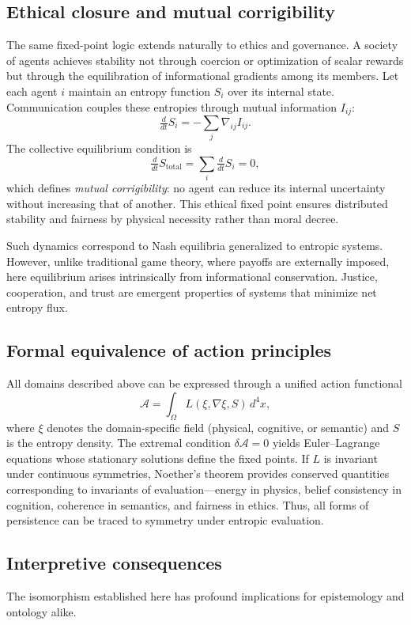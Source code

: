 \documentclass[12pt,a4paper]{article}
\newcommand{\ddt}{\tfrac{d}{dt}}      %
\theoremstyle{plain}
\begin{document}
\subsection{Ethical closure and mutual corrigibility}
The same fixed-point logic extends naturally to ethics and governance.
A society of agents achieves stability not through coercion or optimization of scalar rewards
but through the equilibration of informational gradients among its members.
Let each agent \(i\) maintain an entropy function \(S_i\) over its internal state.
Communication couples these entropies through mutual information \(I_{ij}\):
\[
\ddt S_i = -\sum_j \nabla_{ij} I_{ij}.
\]
The collective equilibrium condition is
\[
\ddt S_\text{total} = \sum_i \ddt S_i = 0,
\]
which defines \emph{mutual corrigibility}:
no agent can reduce its internal uncertainty without increasing that of another.
This ethical fixed point ensures distributed stability and fairness by physical necessity rather than moral decree.

Such dynamics correspond to Nash equilibria generalized to entropic systems.
However, unlike traditional game theory, where payoffs are externally imposed,
here equilibrium arises intrinsically from informational conservation.
Justice, cooperation, and trust are emergent properties of systems that minimize net entropy flux.

\subsection{Formal equivalence of action principles}
All domains described above can be expressed through a unified action functional
\[
\mathcal{A} = \int_\Omega L(\xi, \nabla \xi, S)\, d^4x,
\]
where \(\xi\) denotes the domain-specific field (physical, cognitive, or semantic)
and \(S\) is the entropy density.
The extremal condition
\(\delta\mathcal{A}=0\)
yields Euler–Lagrange equations whose stationary solutions define the fixed points.
If \(L\) is invariant under continuous symmetries,
Noether’s theorem provides conserved quantities corresponding to invariants of evaluation---energy in physics, belief consistency in cognition, coherence in semantics, and fairness in ethics.
Thus, all forms of persistence can be traced to symmetry under entropic evaluation.

\subsection{Interpretive consequences}
The isomorphism established here has profound implications for epistemology and ontology alike.
\end{document}
